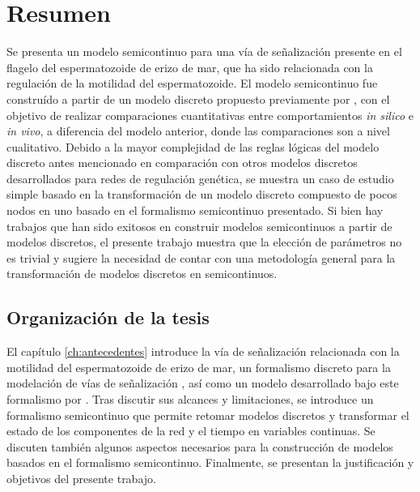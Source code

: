 \begingroup
\let\clearpage\relax
\let\cleardoublepage\relax
\let\cleardoublepage\relax

\chapter*{Resumen}

Se presenta un modelo semicontinuo para una vía de señalización presente en el flagelo del espermatozoide de erizo de mar, que ha sido relacionada con la regulación de la motilidad del espermatozoide. El modelo semicontinuo fue construído a partir de un modelo discreto propuesto previamente por \citeauthor{Espinal2011} \citep{Espinal2011}, con el objetivo de realizar comparaciones cuantitativas entre comportamientos \emph{in silico} e \emph{in vivo}, a diferencia del modelo anterior, donde las comparaciones son a nivel cualitativo. Debido a la mayor complejidad de las reglas lógicas del modelo discreto antes mencionado en comparación con otros modelos discretos desarrollados para redes de regulación genética, se muestra un caso de estudio simple basado en la transformación de un modelo discreto compuesto de pocos nodos en uno basado en el formalismo semicontinuo presentado. Si bien hay trabajos que han sido exitosos en construir modelos semicontinuos a partir de modelos discretos, el presente trabajo muestra que la elección de parámetros no es trivial y sugiere la necesidad de contar con una metodología general para la transformación de modelos discretos en semicontinuos.

\section*{Organización de la tesis}

El capítulo \ref{ch:antecedentes} introduce la vía de señalización relacionada con la motilidad del espermatozoide de erizo de mar, un formalismo discreto para la modelación de vías de señalización , así como un modelo desarrollado bajo este formalismo por \citeauthor{Espinal2011} \citep{Espinal2011}. Tras discutir sus alcances y limitaciones, se introduce un formalismo semicontinuo que permite retomar modelos discretos y transformar el estado de los componentes de la red y el tiempo en variables continuas. Se discuten también algunos aspectos necesarios para la construcción de modelos basados en el formalismo semicontinuo. Finalmente, se presentan la justificación y objetivos del presente trabajo.

